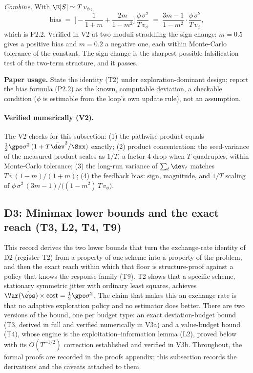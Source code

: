 \emph{Combine.} With $\E[S]\simeq T\,v_\phi$,
\begin{equation*}
\mathrm{bias}
\;=\; \Big[-\frac{1}{1+m}+\frac{2m}{1-m^2}\Big]\,
\frac{\phi\,\sigma^2}{T\,v_\phi}
\;=\; \frac{3m-1}{1-m^2}\cdot\frac{\phi\,\sigma^2}{T\,v_\phi},
\end{equation*}
which is P2.2. Verified in V2 at two moduli straddling the sign change: $m=0.5$
gives a positive bias and $m=0.2$ a negative one, each within Monte-Carlo tolerance
of the constant. The sign change is the sharpest possible falsification test of the
two-term structure, and it passes.

\textbf{Paper usage.} State the identity (T2) under exploration-dominant design;
report the bias formula (P2.2) as the known, computable deviation, a checkable
condition ($\phi$ is estimable from the loop's own update rule), not an assumption.

\paragraph{Verified numerically (V2).}
The V2 checks for this subsection: (1) the pathwise product equals
$\tfrac12\gpo\sigma^2\,(1+T\bar{\dev}^2/\Sxx)$ exactly; (2) product concentration:
the seed-variance of the measured product scales as $1/T$, a factor-4 drop when $T$
quadruples, within Monte-Carlo tolerance; (3) the long-run variance of
$\sum_t\dev_t$ matches $T\,v\,(1-m)/(1+m)$; (4) the feedback bias: sign, magnitude,
and $1/T$ scaling of $\phi\,\sigma^2\,(3m-1)/\big((1-m^2)\,T\,v_\phi\big)$.

\subsection*{D3: Minimax lower bounds and the exact reach (T3, L2, T4, T9)}

This record derives the two lower bounds that turn the exchange-rate identity
of D2 (register T2) from a property of one scheme into a property of the
problem, and then the exact reach within which that floor is structure-proof
against a policy that knows the response family (T9). T2 shows that a
specific scheme, stationary symmetric jitter with ordinary least squares,
achieves $\Var(\hat\eps)\times\text{cost} = \tfrac{1}{2}\gpo\sigma^2$. The
claim that makes this an exchange rate is that no adaptive exploration
policy and no estimator does better. There are two versions of the bound,
one per budget type: an exact deviation-budget bound (T3, derived in full
and verified numerically in V3a) and a value-budget bound (T4), whose engine
is the exploitation--information lemma (L2), proved below with its
$O(T^{-1/2})$ correction established and verified in V3b. Throughout, the
formal proofs are recorded in the proofs appendix; this subsection records
the derivations and the caveats attached to them.

